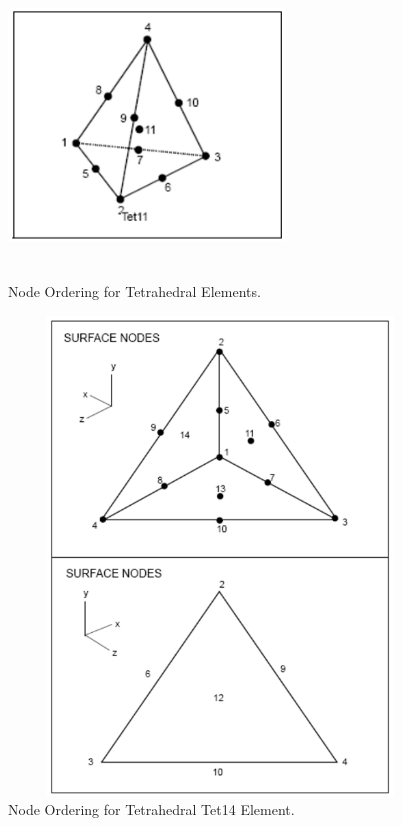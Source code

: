 \begin{figure}
\begin{center}
{\includegraphics[width=2.9in, height=2.9in]{topology/tet11.png}}
\caption{Node Ordering for Tetrahedral Elements.}\label{topology:tet}
\end{center}
\end{figure}

\begin{figure}
\begin{center}
\includegraphics[width=5.000in, height=5.000in]{topology/tet14.png}
\caption{Node Ordering for Tetrahedral Tet14 Element.}\label{topology:tet14}
\end{center}
\end{figure}


